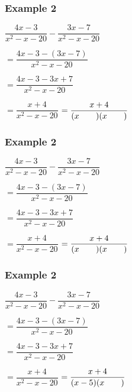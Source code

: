 \documentclass[14pt]{beamer}
\begin{document}
    \begin{frame}
    	\frametitle{Example 2}
    	$ \dfrac{4x - 3}{x^2 -x - 20} - \dfrac{3x - 7}{x^2 -x - 20} $ 
    	
    	\vspace{1em} $ = \dfrac{4x - 3 - (3x - 7)}{x^2 -x - 20} $ 
    	
    	\vspace{1em} $ = \dfrac{4x - 3- 3x + 7}{x^2 -x - 20} $ 
    	
    	\vspace{1em} $ = \dfrac{x + 4}{ x^2 -x - 20} $ 
    	$ = \dfrac{x + 4}{(x\text{\hspace{2em}})(x\text{\hspace{2em}})} $ 
    	
    \end{frame}

    \begin{frame}
    	\frametitle{Example 2}
    	$ \dfrac{4x - 3}{x^2 -x - 20} - \dfrac{3x - 7}{x^2 -x - 20} $ 
    	
    	\vspace{1em} $ = \dfrac{4x - 3 - (3x - 7)}{x^2 -x - 20} $ 
    	
    	\vspace{1em} $ = \dfrac{4x - 3- 3x + 7}{x^2 -x - 20} $ 
    	
    	\vspace{1em} $ = \dfrac{x + 4}{ x^2 -x - 20} $ 
    	$ = \dfrac{x + 4}{(x\text{\hspace{2em}})(x\text{\hspace{2em}})} $ 
    	
     \end{frame}

     \begin{frame}
    	\frametitle{Example 2}
    	$ \dfrac{4x - 3}{x^2 -x - 20} - \dfrac{3x - 7}{x^2 -x - 20} $ 
    	
    	\vspace{1em} $ = \dfrac{4x - 3 - (3x - 7)}{x^2 -x - 20} $ 
    	
    	\vspace{1em} $ = \dfrac{4x - 3- 3x + 7}{x^2 -x - 20} $ 
    	
    	\vspace{1em} $ = \dfrac{x + 4}{x^2 -x - 20} $ 
    	$ = \dfrac{x + 4}{(x - 5)(x \text{\hspace{2em}})} $ 
    	
    \end{frame}
\end{document}

